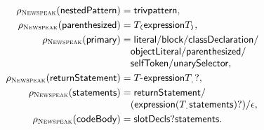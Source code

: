 \begin{equation}
\begin{aligned}
 \rho_{\NS}(\mathsf{nestedPattern})&=\mathsf{triv}\mathsf{pattern},\\
 \rho_{\NS}(\mathsf{parenthesized})&=
      T_{\texttt{(}}\mathsf{expression}T_{\texttt{)}},\\
 \rho_{\NS}(\mathsf{primary})&=\mathsf{literal}/\mathsf{block}/
      \mathsf{classDeclaration}/\\[-1mm]
 &\quad\mathsf{objectLiteral}/\mathsf{parenthesized}/\\[-1mm]
 &\quad\mathsf{selfToken}/\mathsf{unarySelector},\\
 \rho_{\NS}(\mathsf{returnStatement})&=T_{\texttt{\char94}}
      \mathsf{expression}T_{\texttt{.}}?,\\
 \rho_{\NS}(\mathsf{statements})&=\mathsf{returnStatement}/\\[-1mm]
 &\quad(\mathsf{expression}(T_{\texttt{.}}\mathsf{statements})?)/\epsilon,\\
 \rho_{\NS}(\mathsf{codeBody})&=\mathsf{slotDecls}?\mathsf{statements}.
\end{aligned}
\end{equation}

